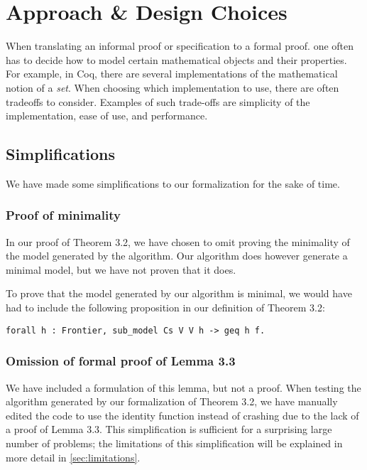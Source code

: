\chapter{Approach \& Design Choices}
\label{ch:approach_design_choices}

When translating an informal proof or specification to a formal proof.
one often has to decide how to model certain mathematical objects and their properties.
For example, in Coq, there are several implementations of the mathematical notion of a \textit{set}.
When choosing which implementation to use, there are often tradeoffs to consider.
Examples of such trade-offs are simplicity of the implementation, ease of use, and performance.

\section{Simplifications}
\label{sec:simplifications}

We have made some simplifications to our formalization for the sake of time.

\subsection{Proof of minimality}
\label{ssec:proof_of_minimality}

In our proof of Theorem 3.2, we have chosen to omit proving the minimality of the model generated by the algorithm.
Our algorithm does however generate a minimal model, but we have not proven
that it does.

To prove that the model generated by our algorithm is minimal,
we would have had to include the following proposition in our definition of Theorem 3.2:

\begin{minipage}{\linewidth}
\begin{lstlisting}[language=Coq, label={lst:minimal_model}, caption={Proposition for minimal model}]
forall h : Frontier, sub_model Cs V V h -> geq h f.
\end{lstlisting}
\end{minipage}

\subsection{Omission of formal proof of Lemma 3.3}
\label{ssec:omission_of_formal_proof_of_lemma_3_3}

We have included a formulation of this lemma, but not a proof.
When testing the algorithm generated by our formalization of Theorem 3.2,
we have manually edited the code to use the identity function instead of crashing due to
the lack of a proof of Lemma 3.3.
This simplification is sufficient for a surprising large number of problems;
the limitations of this simplification will be explained in more detail in \autoref{sec:limitations}.

